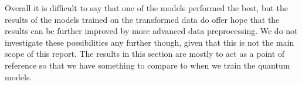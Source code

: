 Overall it is difficult to say that one of the models performed the best, but the results of the models trained on the transformed data do offer hope that the results can be further improved by more advanced data preprocessing.
We do not investigate these possibilities any further though, given that this is not the main scope of this report.
The results in this section are mostly to act as a point of reference so that we have something to compare to when we train the quantum models.
